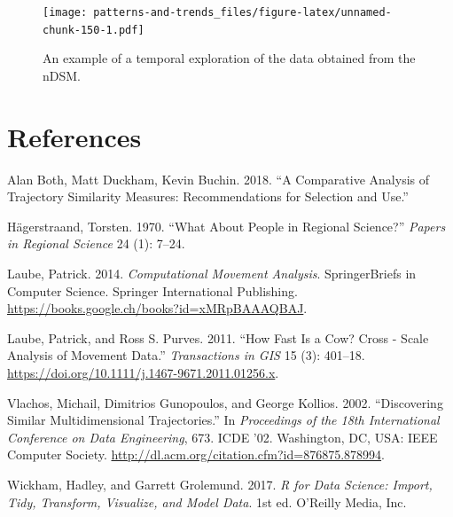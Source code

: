 \documentclass[]{book}
\begin{document}
\begin{figure}
\centering
\texttt{[image: patterns-and-trends\_files/figure-latex/unnamed-chunk-150-1.pdf]}
\caption{\label{fig:unnamed-chunk-150}An example of a temporal exploration of the data obtained from the nDSM.}
\end{figure}

\hypertarget{references}{%
\chapter*{References}\label{references}}

\hypertarget{refs}{}
\leavevmode\hypertarget{ref-both2018}{}%
Alan Both, Matt Duckham, Kevin Buchin. 2018. ``A Comparative Analysis of Trajectory Similarity Measures: Recommendations for Selection and Use.''

\leavevmode\hypertarget{ref-hagerstraand1970}{}%
Hägerstraand, Torsten. 1970. ``What About People in Regional Science?'' \emph{Papers in Regional Science} 24 (1): 7--24.

\leavevmode\hypertarget{ref-laube2014}{}%
Laube, Patrick. 2014. \emph{Computational Movement Analysis}. SpringerBriefs in Computer Science. Springer International Publishing. \url{https://books.google.ch/books?id=xMRpBAAAQBAJ}.

\leavevmode\hypertarget{ref-laube2011}{}%
Laube, Patrick, and Ross S. Purves. 2011. ``How Fast Is a Cow? Cross - Scale Analysis of Movement Data.'' \emph{Transactions in GIS} 15 (3): 401--18. \url{https://doi.org/10.1111/j.1467-9671.2011.01256.x}.

\leavevmode\hypertarget{ref-vlachos2002}{}%
Vlachos, Michail, Dimitrios Gunopoulos, and George Kollios. 2002. ``Discovering Similar Multidimensional Trajectories.'' In \emph{Proceedings of the 18th International Conference on Data Engineering}, 673. ICDE '02. Washington, DC, USA: IEEE Computer Society. \url{http://dl.acm.org/citation.cfm?id=876875.878994}.

\leavevmode\hypertarget{ref-wickham2017}{}%
Wickham, Hadley, and Garrett Grolemund. 2017. \emph{R for Data Science: Import, Tidy, Transform, Visualize, and Model Data}. 1st ed. O'Reilly Media, Inc.
\end{document}

